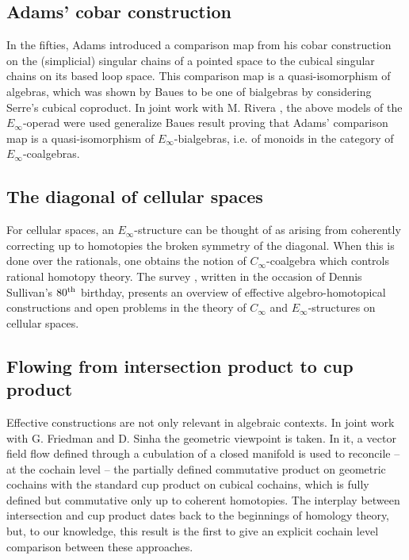 \subsection{Adams' cobar construction} \label{ss:e-infty operads}

In the fifties, Adams introduced a comparison map from his cobar construction on the (simplicial) singular chains of a pointed space to the cubical singular chains on its based loop space.
This comparison map is a quasi-isomorphism of algebras, which was shown by Baues to be one of bialgebras by considering Serre's cubical coproduct.
In joint work with  M. Rivera \cite{medina2021cobar}, the above models of the $E_\infty$-operad were used generalize Baues result proving that Adams' comparison map is a quasi-isomorphism of $E_{\infty}$-bialgebras, i.e. of monoids in the category of $E_{\infty}$-coalgebras.

\subsection{The diagonal of cellular spaces}

For cellular spaces, an $E_\infty$-structure can be thought of as arising from coherently correcting up to homotopies the broken symmetry of the diagonal.
When this is done over the rationals, one obtains the notion of $C_\infty$-coalgebra which controls rational homotopy theory.
The survey \cite{medina2022dennis}, written in the occasion of Dennis Sullivan's $80^{\mathrm{th}}$ birthday, presents an overview of effective algebro-homotopical constructions and open problems in the theory of $C_\infty$ and $E_\infty$-structures on cellular spaces.

\subsection{Flowing from intersection product to cup product} \label{ss:flowing}

Effective constructions are not only relevant in algebraic contexts.
In joint work with G. Friedman and D. Sinha \cite{medina2021flowing} the geometric viewpoint is taken.
In it, a vector field flow defined through a cubulation of a closed manifold is used to reconcile -- at the cochain level -- the partially defined commutative product on geometric cochains with the standard cup product on cubical cochains, which is fully defined but commutative only up to coherent homotopies.
The interplay between intersection and cup product dates back to the beginnings of homology theory, but, to our knowledge, this result is the first to give an explicit cochain level comparison between these approaches.

